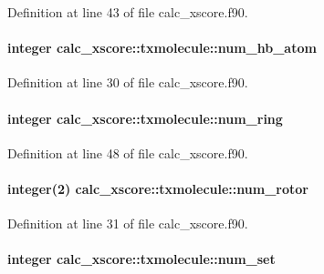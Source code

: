Definition at line 43 of file calc\-\_\-xscore.\-f90.

\hypertarget{structcalc__xscore_1_1txmolecule_a235f128aa1b8ce8e6cea96378abd07a2}{
\paragraph[{num\-\_\-hb\-\_\-atom}]{\setlength{\rightskip}{0pt plus 5cm}integer calc\-\_\-xscore\-::txmolecule\-::num\-\_\-hb\-\_\-atom}}\label{structcalc__xscore_1_1txmolecule_a235f128aa1b8ce8e6cea96378abd07a2}


Definition at line 30 of file calc\-\_\-xscore.\-f90.

\hypertarget{structcalc__xscore_1_1txmolecule_a045d6f7b6e85e61131889e8ec6bda8de}{
\paragraph[{num\-\_\-ring}]{\setlength{\rightskip}{0pt plus 5cm}integer calc\-\_\-xscore\-::txmolecule\-::num\-\_\-ring}}\label{structcalc__xscore_1_1txmolecule_a045d6f7b6e85e61131889e8ec6bda8de}


Definition at line 48 of file calc\-\_\-xscore.\-f90.

\hypertarget{structcalc__xscore_1_1txmolecule_aea578adedd3f9431434bd55820aee2e0}{
\paragraph[{num\-\_\-rotor}]{\setlength{\rightskip}{0pt plus 5cm}integer(2) calc\-\_\-xscore\-::txmolecule\-::num\-\_\-rotor}}\label{structcalc__xscore_1_1txmolecule_aea578adedd3f9431434bd55820aee2e0}


Definition at line 31 of file calc\-\_\-xscore.\-f90.

\hypertarget{structcalc__xscore_1_1txmolecule_a5a46773ef3bec23d00456df4e3486c92}{
\paragraph[{num\-\_\-set}]{\setlength{\rightskip}{0pt plus 5cm}integer calc\-\_\-xscore\-::txmolecule\-::num\-\_\-set}}\label{structcalc__xscore_1_1txmolecule_a5a46773ef3bec23d00456df4e3486c92}


